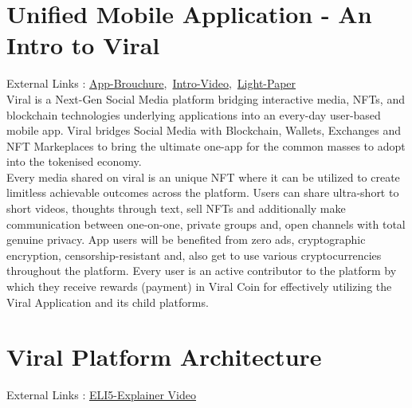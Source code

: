 \documentclass[10pt]{article}
\begin{document}
\newpage
\section{Unified Mobile Application - An Intro to Viral}


External Links : \hyperlink{https://sample.com}{App-Brouchure},\ \hyperlink{https://sample.com}{Intro-Video},\ \hyperlink{https://sample.com}{Light-Paper}\\


Viral is a Next-Gen Social Media platform bridging interactive media, NFTs, and blockchain technologies\textsc{} underlying applications into an every-day user-based mobile app. Viral bridges Social Media with Blockchain, Wallets, Exchanges and NFT Markeplaces to bring the ultimate one-app for the common masses to adopt into the tokenised economy.\\

Every media shared on viral is an unique NFT where it can be utilized to create limitless achievable outcomes across the platform. Users can share ultra-short to short videos, thoughts through text, sell NFTs and additionally make communication between one-on-one, private groups and, open channels with total genuine privacy. App users will be benefited from zero ads, cryptographic encryption, censorship-resistant and, also get to use various cryptocurrencies throughout the platform. Every user is an active contributor to the platform by which they receive rewards (payment) in Viral Coin for effectively utilizing the Viral Application and it\textsc{}s child platforms.\\

\section{Viral Platform Architecture}

External Links : \hyperlink{https://sample.com}{ELI5-Explainer Video}\\
\end{document}
